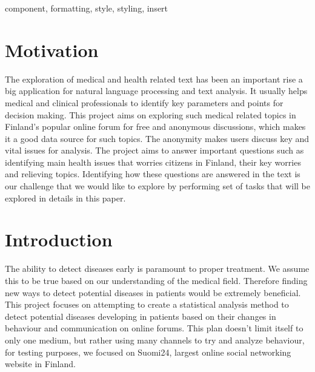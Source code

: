 \documentclass[conference]{IEEEtran}
\begin{document}
\begin{IEEEkeywords}
    component, formatting, style, styling, insert
\end{IEEEkeywords}

\section{Motivation}
The exploration of medical and health related text has been an important rise a big application for natural language processing and text analysis. It usually helps medical and clinical professionals to identify key parameters and points for decision making. This project aims on exploring such medical related topics in Finland’s popular online forum for free and anonymous discussions, which makes it a good data source for such topics. The anonymity makes users discuss key and vital issues for analysis. The project aims to answer important questions such as identifying main health issues that worries citizens in Finland, their key worries and relieving topics. Identifying how these questions are answered in the text is our challenge that we would like to explore by performing set of tasks that will be explored in details in this paper.

\section{Introduction}
The ability to detect diseases early is paramount to proper treatment. We assume this to be true based on our understanding of the medical field. Therefore finding new ways to detect potential diseases in patients would be extremely beneficial. This project focuses on attempting to create a statistical analysis method to detect potential diseases developing in patients based on their changes in behaviour and communication on online forums. This plan doesn’t limit itself to only one medium, but rather using many channels to try and analyze behaviour, for testing purposes, we focused on Suomi24, largest online social networking website in Finland.
\end{document}
